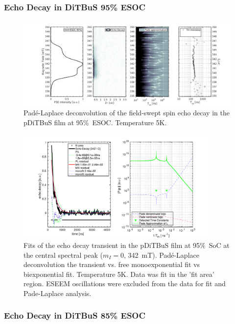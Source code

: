 \newpage
\subsubsection{Echo Decay in DiTBuS 95\% ESOC}
\begin{figure}[h]
\center
	\includegraphics[width=1\textwidth]{./pulse/figures/Figure_S10.pdf}
	\caption{Pad{\'e}-Laplace deconvolution of the field-swept spin echo decay in the pDiTBuS film at 95\%~ESOC. Temperature 5K.}
	\label{fig:Figure_S10}
\end{figure}


\begin{figure}[ht!]
\center
	\includegraphics[width=0.9\textwidth]{./pulse/figures/Figure_S11.pdf}
	\caption{Fits of the echo decay transient in the pDiTBuS film at 95\%~SoC at the central spectral peak ($m_I=0$, 342~mT). Pad{\'e}-Laplace deconvolution the transient vs. free monoexponential fit vs biexponential fit. Temperature 5K. Data was fit in the 'fit area' region. ESEEM oscillations were excluded from the data for fit and Pade-Laplace analysis.}
	\label{fig:Figure_S11}
\end{figure}


\newpage
\subsubsection{Echo Decay in DiTBuS 85\% ESOC}

